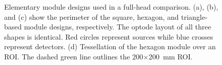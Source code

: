 \begin{figure}
    \begin{center}
    \end{center}
    \caption {Elementary module designs used in a full-head comparison. (a), (b), and (c) show the perimeter of the square, hexagon, and triangle-based module designs, respectively. The optode layout of all three shapes is identical. Red circles represent sources while blue crosses represent detectors. (d) Tessellation of the hexagon module over an ROI. The dashed green line outlines the 200$\times$200~mm ROI.} \label{fig:fullmodules}
\end{figure} 

